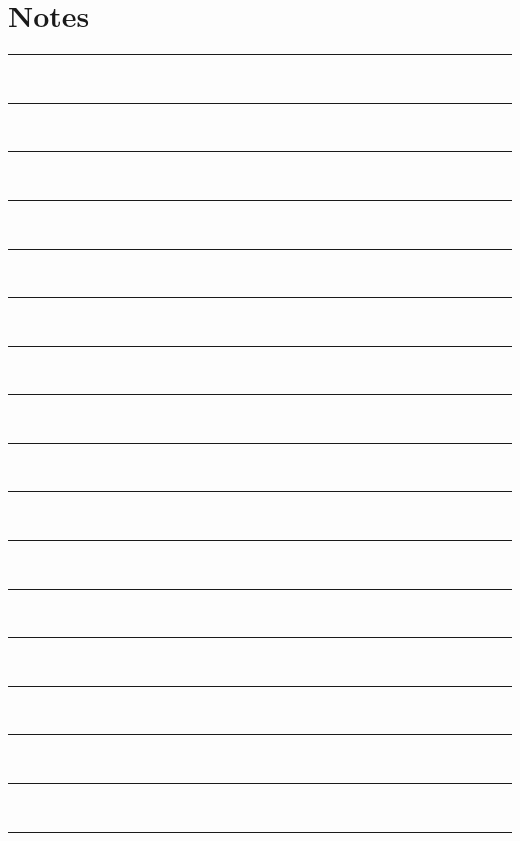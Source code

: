 \newpage
\section{Notes}

\vspace{1em}

\rule{\textwidth}{0.4pt} \\[1.5em]
\rule{\textwidth}{0.4pt} \\[1.5em]
\rule{\textwidth}{0.4pt} \\[1.5em]
\rule{\textwidth}{0.4pt} \\[1.5em]
\rule{\textwidth}{0.4pt} \\[1.5em]
\rule{\textwidth}{0.4pt} \\[1.5em]
\rule{\textwidth}{0.4pt} \\[1.5em]
\rule{\textwidth}{0.4pt} \\[1.5em]
\rule{\textwidth}{0.4pt} \\[1.5em]
\rule{\textwidth}{0.4pt} \\[1.5em]
\rule{\textwidth}{0.4pt} \\[1.5em]
\rule{\textwidth}{0.4pt} \\[1.5em]
\rule{\textwidth}{0.4pt} \\[1.5em]
\rule{\textwidth}{0.4pt} \\[1.5em]
\rule{\textwidth}{0.4pt} \\[1.5em]
\rule{\textwidth}{0.4pt} \\[1.5em]
\rule{\textwidth}{0.4pt} \\[1.5em]


